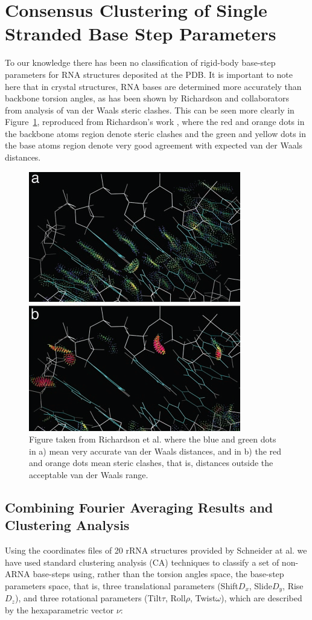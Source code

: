 \section{Consensus Clustering of Single Stranded Base Step Parameters}
To our  knowledge there has  been no classification of rigid-body
base-step  parameters for RNA structures deposited at  the
PDB. It is important
to note here that in  crystal structures, RNA bases are determined more
accurately  than  backbone  torsion  angles,  as  has  been  shown  by
Richardson  and collaborators from  analysis of  van der  Waals steric
clashes.   This can  be seen  more clearly  in Figure~\ref{fig:murray},
reproduced from Richardson's work \cite{murray2003}, where the red
and orange dots  in the backbone atoms region  denote steric clashes and
the green  and yellow  dots in  the base atoms  region denote  very good
agreement with expected van der Waals distances.

\begin{figure}[htbp]
 \centering
 \includegraphics[scale=0.5]{Chapter2/murray2003.png}
 \caption{Figure taken from  Richardson et al. \cite{murray2003} where
 the  blue and  green dots  in  a) mean  very accurate  van der  Waals
 distances, and  in b)  the red and  orange dots mean  steric clashes,
 that is, distances outside the acceptable van der Waals range.}
 \label{fig:murray}
\end{figure}

\subsection{Combining Fourier Averaging Results and Clustering Analysis}
Using the coordinates files of 20 rRNA structures provided by 
Schneider at al.\cite{schneider2004}  we have
used standard clustering analysis (CA) techniques to classify a set of
non-ARNA base-steps  using, rather than the torsion  angles space, the
base-step  parameters space, that  is, three  translational parameters
(Shift$D_x$, Slide$D_y$,  Rise$D_z$), and three  rotational parameters
(Tilt$\tau$,  Roll$\rho$, Twist$\omega$), which  are described  by the
hexaparametric vector $\nu$:

